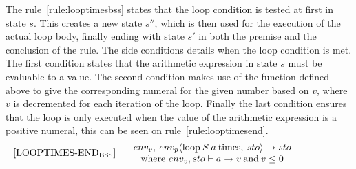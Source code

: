 \noindent
The rule~\ref{rule:looptimesbss} states that the loop condition is tested at first in state $s$. This creates a new state $s''$, which is then used for the execution of the actual loop body, finally ending with state $s'$ in both the premise and the conclusion of the rule. The side conditions details when the loop condition is met. The first condition states that the arithmetic expression in state $s$ must be evaluable to a value. The second condition makes use of the function defined above to give the corresponding numeral for the given number based on $v$, where $v$ is decremented for each iteration of the loop. Finally the last condition ensures that the loop is only executed when the value of the arithmetic expression is a positive numeral, this can be seen on rule~\ref{rule:looptimesend}.
\begin{equation}\label{rule:looptimesend}
\begin{minipage}{.2\linewidth}
$[\text{LOOPTIMES-END}_\text{BSS}]$
\end{minipage}
\begin{minipage}{.8\linewidth}
\centering
$env_v, \: env_p \langle \text{loop} \: S \: a \: \text{times}, \: sto \rangle \xrightarrow{} sto$ 
\\
where $env_v, sto \vdash a \xrightarrow{} v \: \text{and} \: v \leq 0$
\end{minipage}
\end{equation}

